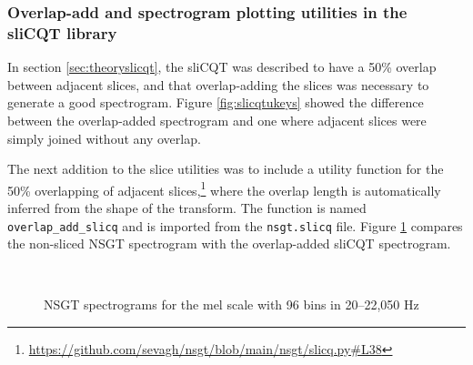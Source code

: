 \documentclass[report.tex]{subfiles}
\begin{document}
\subsubsection{Overlap-add and spectrogram plotting utilities in the sliCQT library}
\label{sec:slicqtutil}

In section \ref{sec:theoryslicqt}, the sliCQT was described to have a 50\% overlap between adjacent slices, and that overlap-adding the slices was necessary to generate a good spectrogram. Figure \ref{fig:slicqtukeys} showed the difference between the overlap-added spectrogram and one where adjacent slices were simply joined without any overlap.

The next addition to the slice utilities was to include a utility function for the 50\% overlapping of adjacent slices,\footnote{\url{https://github.com/sevagh/nsgt/blob/main/nsgt/slicq.py\#L38}} where the overlap length is automatically inferred from the shape of the transform. The function is named \Verb#overlap_add_slicq# and is imported from the \Verb#nsgt.slicq# file. Figure \ref{fig:overlappedspectrograms} compares the non-sliced NSGT spectrogram with the overlap-added sliCQT spectrogram.

\begin{figure}[ht]
	\centering
	\\
	\caption{NSGT spectrograms for the mel scale with 96 bins in 20--22,050 Hz}
	\label{fig:overlappedspectrograms}
\end{figure}
\end{document}
